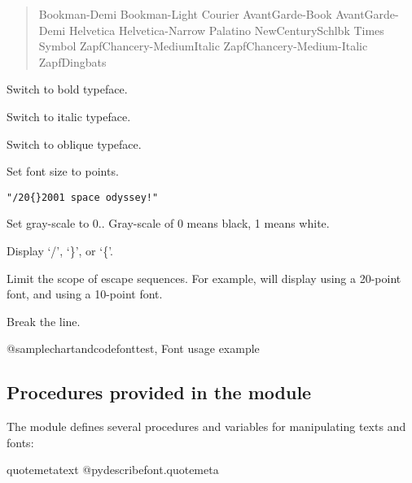 \documentclass{howto}
\begin{document}
\begin{description}
\begin{quote}
Bookman-Demi Bookman-Light Courier AvantGarde-Book AvantGarde-Demi
Helvetica Helvetica-Narrow Palatino NewCenturySchlbk Times
Symbol ZapfChancery-MediumItalic ZapfChancery-Medium-Italic ZapfDingbats
\end{quote}

\item[\code{/b}:] Switch to bold typeface.
\item[\code{/i}:] Switch to italic typeface.
\item[\code{/o}:] Switch to oblique typeface.
\item[\code{/}\var{dd}:] Set font size to  points.

\begin{verbatim}
"/20{}2001 space odyssey!"
\end{verbatim}

\item[\code{/c}\var{dd}:] Set gray-scale to 0..
Gray-scale of 0 means black, 1 means white.

\item[\code{//}, \code{/\{}, \code{/\}}:] Display `/', `\}', or `\{'.
\item[\code{\{ ... \}}:] Limit the scope of escape sequences. For example,
will display  using
a 20-point font, and  using a 10-point font.
\index{\{}
\index{\}}
\index{/}


\item[\code{$\backslash$n}:] Break the line.
\end{description}

@samplechartandcode{fonttest, Font usage example}

\subsection{Procedures provided in the  module}
The  module defines several procedures and variables for
manipulating texts and fonts:

\begin{funcdesc}{quotemeta}{text}
@pydescribe{font.quotemeta}
\end{funcdesc}
\end{document}
